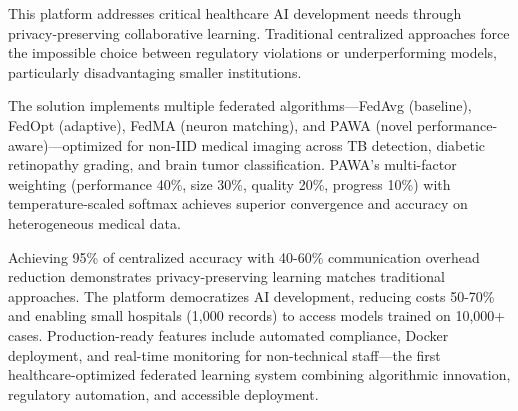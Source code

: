 This platform addresses critical healthcare AI development needs through privacy-preserving collaborative learning. Traditional centralized approaches force the impossible choice between regulatory violations or underperforming models, particularly disadvantaging smaller institutions.

The solution implements multiple federated algorithms—FedAvg (baseline), FedOpt (adaptive), FedMA (neuron matching), and PAWA (novel performance-aware)—optimized for non-IID medical imaging across TB detection, diabetic retinopathy grading, and brain tumor classification. PAWA's multi-factor weighting (performance 40\%, size 30\%, quality 20\%, progress 10\%) with temperature-scaled softmax achieves superior convergence and accuracy on heterogeneous medical data.

Achieving 95\% of centralized accuracy with 40-60\% communication overhead reduction demonstrates privacy-preserving learning matches traditional approaches. The platform democratizes AI development, reducing costs 50-70\% and enabling small hospitals (1,000 records) to access models trained on 10,000+ cases. Production-ready features include automated compliance, Docker deployment, and real-time monitoring for non-technical staff—the first healthcare-optimized federated learning system combining algorithmic innovation, regulatory automation, and accessible deployment.

